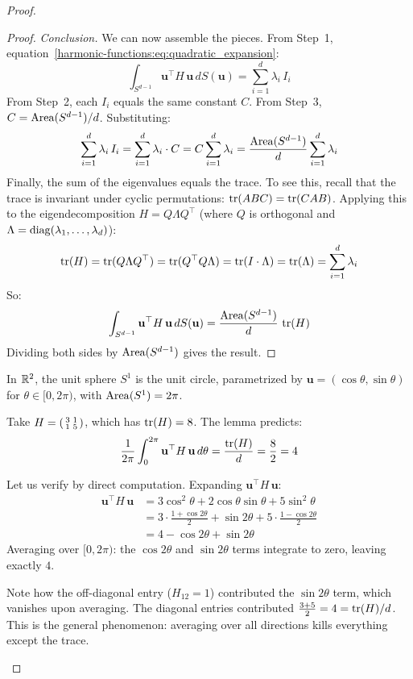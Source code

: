 \begin{notechapter}
\begin{proof}
\begin{proof}
\emph{Conclusion.} We can now assemble the pieces. From
Step~1, equation~\eqref{harmonic-functions:eq:quadratic_expansion}:
\[
\int_{S^{d-1}} \mathbf{u}^\top H\,\mathbf{u}\,dS(\mathbf{u})
= \sum_{i=1}^d \lambda_i\, I_i
\]
From Step~2, each $I_i$ equals the same constant $C$. From Step~3,
$C = \operatorname{Area}(S^{d-1})/d$. Substituting:
\[
\sum_{i=1}^d \lambda_i\, I_i
= \sum_{i=1}^d \lambda_i \cdot C
= C \sum_{i=1}^d \lambda_i
= \frac{\operatorname{Area}(S^{d-1})}{d}\sum_{i=1}^d \lambda_i
\]
Finally, the sum of the eigenvalues equals the trace. To see this, recall
that the trace is invariant under cyclic permutations:
$\operatorname{tr}(ABC) = \operatorname{tr}(CAB)$. Applying this to the eigendecomposition
$H = Q\Lambda Q^\top$ (where $Q$ is orthogonal and $\Lambda = \operatorname{diag}(\lambda_1, \ldots, \lambda_d)$):
\[
\operatorname{tr}(H) = \operatorname{tr}(Q\Lambda Q^\top) = \operatorname{tr}(Q^\top Q\Lambda)
= \operatorname{tr}(I \cdot \Lambda) = \operatorname{tr}(\Lambda) = \sum_{i=1}^d \lambda_i
\]
So:
\[
\int_{S^{d-1}} \mathbf{u}^\top H\,\mathbf{u}\,dS(\mathbf{u})
= \frac{\operatorname{Area}(S^{d-1})}{d}\,\operatorname{tr}(H)
\]
Dividing both sides by $\operatorname{Area}(S^{d-1})$ gives the result.
\end{proof}

\begin{example}
In $\mathbb{R}^2$, the unit sphere $S^1$ is the unit circle, parametrized by
$\mathbf{u} = (\cos\theta, \sin\theta)$ for $\theta \in [0, 2\pi)$, with
$\operatorname{Area}(S^1) = 2\pi$.

Take $H = \begin{psmallmatrix} 3 & 1 \\ 1 & 5 \end{psmallmatrix}$, which
has $\operatorname{tr}(H) = 8$. The lemma predicts:
\[
\frac{1}{2\pi}\int_0^{2\pi}
  \mathbf{u}^\top H\,\mathbf{u}\,d\theta
= \frac{\operatorname{tr}(H)}{d} = \frac{8}{2} = 4
\]

Let us verify by direct computation. Expanding
$\mathbf{u}^\top H\,\mathbf{u}$:
\begin{align}
\mathbf{u}^\top H\,\mathbf{u}
&= 3\cos^2\theta + 2\cos\theta\sin\theta + 5\sin^2\theta \\
&= 3\cdot\tfrac{1+\cos 2\theta}{2}
 + \sin 2\theta
 + 5\cdot\tfrac{1-\cos 2\theta}{2} \\
&= 4 - \cos 2\theta + \sin 2\theta
\end{align}
Averaging over $[0, 2\pi)$: the $\cos 2\theta$ and $\sin 2\theta$ terms
integrate to zero, leaving exactly $4$.

Note how the off-diagonal entry ($H_{12} = 1$) contributed the
$\sin 2\theta$ term, which vanishes upon averaging. The diagonal entries
contributed $\frac{3+5}{2} = 4 = \operatorname{tr}(H)/d$. This is the general
phenomenon: averaging over all directions kills everything except the trace.
\end{example}


\end{proof}
\end{notechapter}
